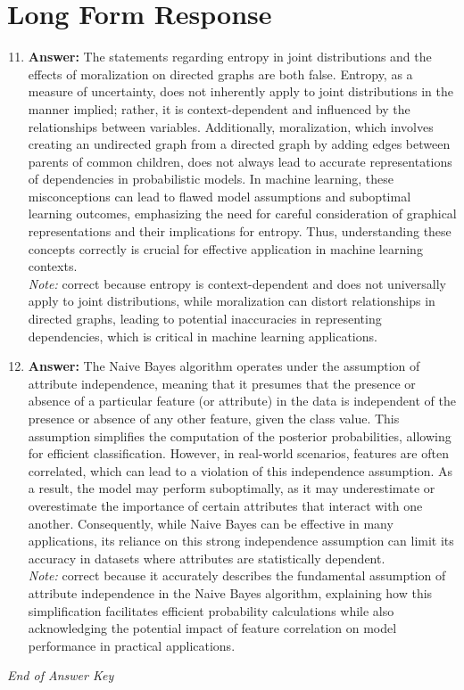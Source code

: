\documentclass[12pt]{article}
\begin{document}
\section*{Long Form Response}
\begin{enumerate}[label=\arabic*.]
\setcounter{enumi}{10}
\item \textbf{Answer:} The statements regarding entropy in joint distributions and the effects of moralization on directed graphs are both false. Entropy, as a measure of uncertainty, does not inherently apply to joint distributions in the manner implied; rather, it is context-dependent and influenced by the relationships between variables. Additionally, moralization, which involves creating an undirected graph from a directed graph by adding edges between parents of common children, does not always lead to accurate representations of dependencies in probabilistic models. In machine learning, these misconceptions can lead to flawed model assumptions and suboptimal learning outcomes, emphasizing the need for careful consideration of graphical representations and their implications for entropy. Thus, understanding these concepts correctly is crucial for effective application in machine learning contexts.
\\ \textit{Note:} correct because entropy is context-dependent and does not universally apply to joint distributions, while moralization can distort relationships in directed graphs, leading to potential inaccuracies in representing dependencies, which is critical in machine learning applications.
\item \textbf{Answer:} The Naive Bayes algorithm operates under the assumption of attribute independence, meaning that it presumes that the presence or absence of a particular feature (or attribute) in the data is independent of the presence or absence of any other feature, given the class value. This assumption simplifies the computation of the posterior probabilities, allowing for efficient classification. However, in real-world scenarios, features are often correlated, which can lead to a violation of this independence assumption. As a result, the model may perform suboptimally, as it may underestimate or overestimate the importance of certain attributes that interact with one another. Consequently, while Naive Bayes can be effective in many applications, its reliance on this strong independence assumption can limit its accuracy in datasets where attributes are statistically dependent.
\\ \textit{Note:} correct because it accurately describes the fundamental assumption of attribute independence in the Naive Bayes algorithm, explaining how this simplification facilitates efficient probability calculations while also acknowledging the potential impact of feature correlation on model performance in practical applications.
\end{enumerate}

\vfill
\noindent\textit{End of Answer Key}
\end{document}
